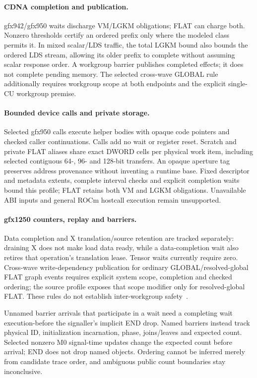 \documentclass[10pt,letterpaper]{article}
\begin{document}
\paragraph{CDNA completion and publication.}
gfx942/gfx950 waits discharge VM/LGKM obligations; FLAT can charge both.
Nonzero thresholds certify an ordered prefix only where the modeled class
permits it. In mixed scalar/LDS traffic, the total LGKM bound also bounds the
ordered LDS stream, allowing its older prefix to complete without assuming
scalar response order. A workgroup barrier publishes completed effects; it does not complete
pending memory. The selected cross-wave GLOBAL rule additionally requires
workgroup scope at both endpoints and the explicit single-CU workgroup premise.

\paragraph{Bounded device calls and private storage.}
Selected gfx950 calls execute helper bodies with opaque code pointers and
checked caller continuations. Calls add no wait or register reset. Scratch and
private FLAT aliases share exact DWORD cells per physical work item, including
selected contiguous 64-, 96- and 128-bit transfers. An opaque aperture tag
preserves address provenance without inventing a runtime base. Fixed descriptor
and metadata extents, complete interval checks and explicit completion waits
bound this profile; FLAT retains both VM and LGKM obligations. Unavailable ABI
inputs and general ROCm hostcall execution remain unsupported.

\paragraph{gfx1250 counters, replay and barriers.}
Data completion and X translation/source retention are tracked separately:
draining X does not make load data ready, while a data-completion wait also
retires that operation's translation lease. Tensor waits currently require zero.
Cross-wave write-dependency publication for ordinary GLOBAL/resolved-global FLAT
graph events requires explicit system scope, completion and checked ordering;
the source profile exposes that scope modifier only for resolved-global FLAT.
These rules do not establish inter-workgroup safety~\cite{llvmprotocols}.

Unnamed barrier arrivals that participate in a wait need a completing wait
execution-before the signaller's implicit END drop. Named barriers instead
track physical ID, initialization incarnation, phase, joins/leaves and expected
count. Selected nonzero M0 signal-time updates change the expected count before
arrival; END does not drop named objects. Ordering cannot be inferred merely
from candidate trace order, and ambiguous public count boundaries stay
inconclusive.
\end{document}
